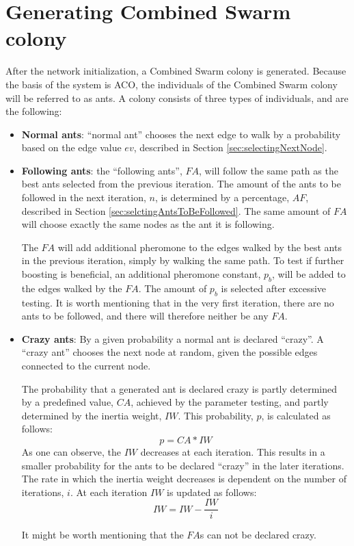 \section{Generating Combined Swarm colony}
\label{sec:algoGeneratingSuperSwarm}
After the network initialization, a Combined Swarm colony is generated. Because the basis of the system is ACO, the individuals of the Combined Swarm colony will be referred to as ants. A colony consists of three types of individuals, and are the following: 

\begin{itemize}
\item \textbf{Normal ants}: ``normal ant'' chooses the next edge to walk by a probability based on the edge value $ev$, described in Section \vref{sec:selectingNextNode}.

\item \textbf{Following ants}: the ``following ants'', $FA$, will follow the same path as the best ants selected from the previous iteration. The amount of the ants to be followed in the next iteration, $n$, is determined by a percentage, $AF$, described in Section \vref{sec:selctingAntsToBeFollowed}. The same amount of $FA$ will choose exactly the same nodes as the ant it is following.

The $FA$ will add additional pheromone to the edges walked by the best ants in the previous iteration, simply by walking the same path. To test if further boosting is beneficial, an additional pheromone constant, $p_b$, will be added to the edges walked by the $FA$. The amount of $p_b$ is selected after excessive testing. It is worth mentioning that in the very first iteration, there are no ants to be followed, and there will therefore neither be any $FA$.  

\item \textbf{Crazy ants}: By a given probability a normal ant is declared ``crazy''. A ``crazy ant'' chooses the next node at random, given the possible edges connected to the current node. 

The probability that a generated ant is declared crazy is partly determined by a predefined value, $CA$, achieved by the parameter testing, and partly determined by the inertia weight, $IW$. This probability, $p$, is calculated as follows:
$$p = CA*IW$$
As one can observe, the $IW$ decreases at each iteration. This results in a smaller probability for the ants to be declared ``crazy'' in the later iterations. The rate in which the inertia weight decreases is dependent on the number of iterations, $i$. At each iteration $IW$ is updated as follows:
$$IW = IW - \frac{IW}{i}$$

It might be worth mentioning that the $FA$s can not be declared crazy. 

\end{itemize}
